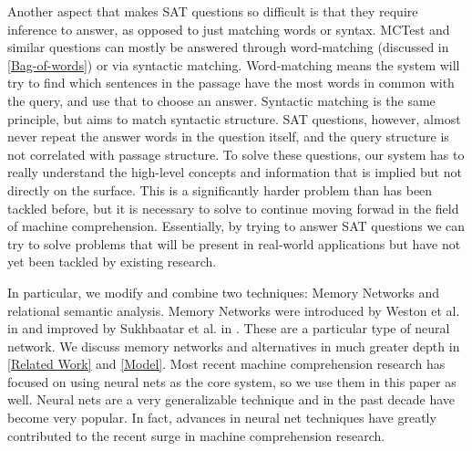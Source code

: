 \documentclass[pageno]{jpaper}
\begin{document}
Another aspect that makes SAT questions so difficult is that they require
inference to answer, as opposed to just matching words or syntax. MCTest and
similar questions can mostly be answered through word-matching (discussed in
\ref{Bag-of-words}) or via syntactic matching. Word-matching means the system
will try to find which sentences in the passage have the most words in common
with the query, and use that to choose an answer. Syntactic matching is the same
principle, but aims to match syntactic structure. SAT questions, however, almost
never repeat the answer words in the question itself, and the query structure is
not correlated with passage structure. To solve these questions, our system has
to really understand the high-level concepts and information that is implied but
not directly on the surface. This is a significantly harder problem than has
been tackled before, but it is necessary to solve to continue moving forwad in
the field of machine comprehension. Essentially, by trying to answer SAT
questions we can try to solve problems that will be present in real-world
applications but have not yet been tackled by existing research.

In particular, we modify and combine two techniques: Memory Networks and
relational semantic analysis. Memory Networks were introduced by Weston et al.
in \cite{Weston2015a} and improved by Sukhbaatar et al. in
\cite{Sukhbaatar2015}. These are a particular type of neural network. We discuss
memory networks and alternatives in much greater depth in \ref{Related Work} and
\ref{Model}. Most recent machine comprehension research has focused on using
neural nets as the core system, so we use them in this paper as well. Neural
nets are a very generalizable technique and in the past decade have become very
popular. In fact, advances in neural net techniques have greatly contributed to
the recent surge in machine comprehension research.
\end{document}
